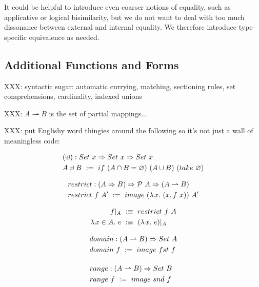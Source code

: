 \documentclass[preprint]{sigplanconf}
\newcommand{\restrict}[1]{\lvert_{#1}}
\newcommand{\pto}{\rightharpoonup}
\begin{document}
It could be helpful to introduce even coarser notions of equality, such as applicative or logical bisimilarity, but we do not want to deal with too much dissonance between external and internal equality.
We therefore introduce type-specific equivalence as needed.

\subsection{Additional Functions and Forms}

XXX: syntactic sugar: automatic currying, matching, sectioning rules, set comprehensions, cardinality, indexed unions

XXX: $A \pto B$ is the set of partial mappings...

XXX: put Englishy word thingies around the following so it's not just a wall of meaningless code:

\begin{equation}
\begin{aligned}
	&(\uplus) : Set~x \Rightarrow Set~x \Rightarrow Set~x \\
	&A \uplus B \ := \ if~(A \cap B = \varnothing)~(A \cup B)~(take~\varnothing)
\end{aligned}
\end{equation}

\begin{equation}
\begin{aligned}
	&restrict : (A \tto B) \tto \powerset~A \tto (A \pto B) \\
	&restrict~f~A' \ := \ image~(\fun{x}{(x, f~x)})~A'
\end{aligned}
\end{equation}

\begin{equation}
\begin{aligned}
	f\restrict{A} &\ :\equiv \ restrict~f~A \\
	\fun{x \in A}{e} &\ :\equiv \ (\fun{x}{e})\restrict{A}
\end{aligned}
\end{equation}

\begin{align}
	&\begin{aligned}
		&domain : (A \pto B) \tto Set~A \\
		&domain~f \ := \ image~fst~f \\
	\end{aligned} \\
\nonumber \\[-6pt]
	&\begin{aligned}
		&range : (A \pto B) \tto Set~B \\
		&range~f \ := \ image~snd~f
	\end{aligned}
\end{align}
\end{document}
